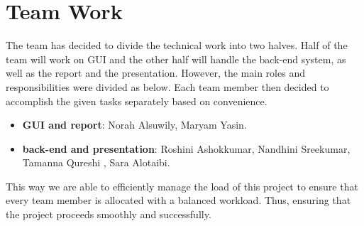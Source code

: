 \documentclass{article}
\begin{document}
\section{Team Work}
The team has decided to divide the technical work into two halves. Half of the team will work on GUI and the other half will handle the back-end system, as well as the report and the presentation. However,  the main roles and responsibilities were divided as below. Each team member then decided to accomplish the given tasks separately based on convenience.
\begin{itemize}

\item \textbf{GUI and report}: Norah Alsuwily, Maryam Yasin.
\item \textbf{back-end and presentation}: Roshini Ashokkumar, Nandhini Sreekumar, Tamanna Qureshi , Sara Alotaibi. 
\end{itemize}
This way we are able to efficiently manage the load of this project to ensure that every team member is allocated with a balanced workload. Thus, ensuring that the project proceeds smoothly and successfully.
\end{document}
